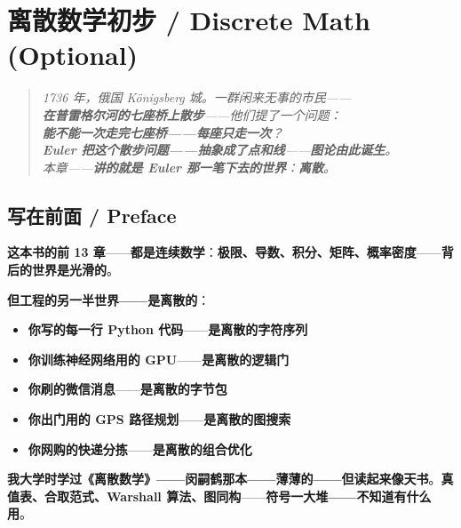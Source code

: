 
\chapter{离散数学初步 / Discrete Math \textnormal{(Optional)}}
\label{ch:discrete}

\begin{quote}\itshape
1736 年，俄国 Königsberg 城。一群闲来无事的市民——\\
\textbf{在普雷格尔河的七座桥上散步}——他们提了一个问题：\\
\textbf{能不能一次走完七座桥——每座只走一次}？\\
\textbf{Euler 把这个散步问题——抽象成了点和线}——\textbf{图论由此诞生}。\\
本章——\textbf{讲的就是 Euler 那一笔下去的世界}：\textbf{离散}。
\end{quote}

\section{写在前面 / Preface}

\textbf{这本书的前 13 章}——\textbf{都是连续数学}：\textbf{极限、导数、积分、矩阵、概率密度}——\textbf{背后的世界是\textbf{光滑}的}。

\textbf{但工程的另一半世界——是\textbf{离散}的}：

\begin{itemize}
\item \textbf{你写的每一行 Python 代码}——\textbf{是离散的字符序列}
\item \textbf{你训练神经网络用的 GPU}——\textbf{是离散的逻辑门}
\item \textbf{你刷的微信消息}——\textbf{是离散的字节包}
\item \textbf{你出门用的 GPS 路径规划}——\textbf{是离散的图搜索}
\item \textbf{你网购的快递分拣}——\textbf{是离散的组合优化}
\end{itemize}

\textbf{我大学时学过《离散数学》——闵嗣鹤那本——薄薄的——但读起来像天书}。\textbf{真值表、合取范式、Warshall 算法、图同构}——\textbf{符号一大堆——不知道有什么用}。

